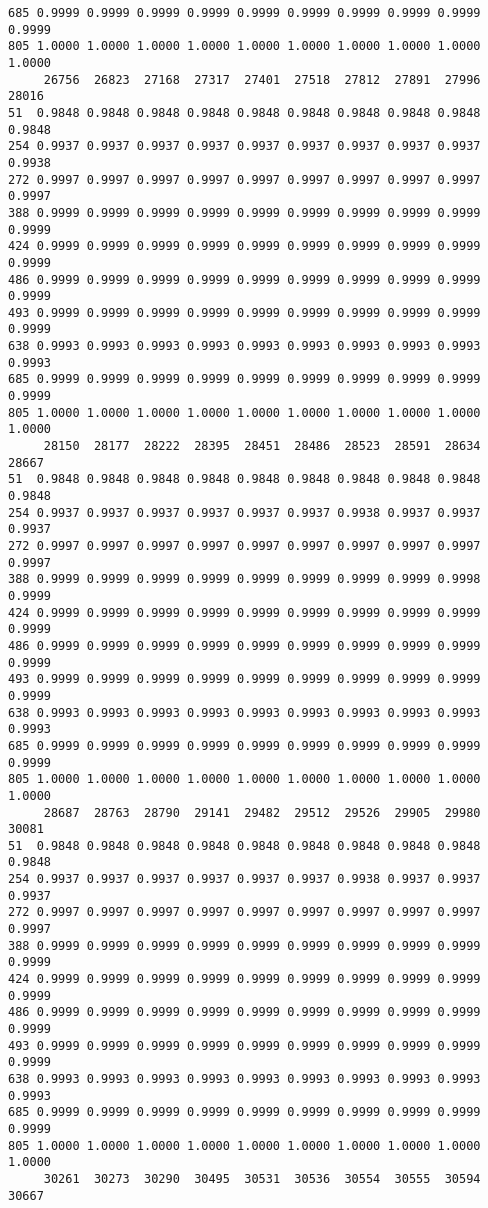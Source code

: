 \documentclass[
]{report}
\begin{document}
\begin{verbatim}
685 0.9999 0.9999 0.9999 0.9999 0.9999 0.9999 0.9999 0.9999 0.9999 0.9999
805 1.0000 1.0000 1.0000 1.0000 1.0000 1.0000 1.0000 1.0000 1.0000 1.0000
     26756  26823  27168  27317  27401  27518  27812  27891  27996  28016
51  0.9848 0.9848 0.9848 0.9848 0.9848 0.9848 0.9848 0.9848 0.9848 0.9848
254 0.9937 0.9937 0.9937 0.9937 0.9937 0.9937 0.9937 0.9937 0.9937 0.9938
272 0.9997 0.9997 0.9997 0.9997 0.9997 0.9997 0.9997 0.9997 0.9997 0.9997
388 0.9999 0.9999 0.9999 0.9999 0.9999 0.9999 0.9999 0.9999 0.9999 0.9999
424 0.9999 0.9999 0.9999 0.9999 0.9999 0.9999 0.9999 0.9999 0.9999 0.9999
486 0.9999 0.9999 0.9999 0.9999 0.9999 0.9999 0.9999 0.9999 0.9999 0.9999
493 0.9999 0.9999 0.9999 0.9999 0.9999 0.9999 0.9999 0.9999 0.9999 0.9999
638 0.9993 0.9993 0.9993 0.9993 0.9993 0.9993 0.9993 0.9993 0.9993 0.9993
685 0.9999 0.9999 0.9999 0.9999 0.9999 0.9999 0.9999 0.9999 0.9999 0.9999
805 1.0000 1.0000 1.0000 1.0000 1.0000 1.0000 1.0000 1.0000 1.0000 1.0000
     28150  28177  28222  28395  28451  28486  28523  28591  28634  28667
51  0.9848 0.9848 0.9848 0.9848 0.9848 0.9848 0.9848 0.9848 0.9848 0.9848
254 0.9937 0.9937 0.9937 0.9937 0.9937 0.9937 0.9938 0.9937 0.9937 0.9937
272 0.9997 0.9997 0.9997 0.9997 0.9997 0.9997 0.9997 0.9997 0.9997 0.9997
388 0.9999 0.9999 0.9999 0.9999 0.9999 0.9999 0.9999 0.9999 0.9998 0.9999
424 0.9999 0.9999 0.9999 0.9999 0.9999 0.9999 0.9999 0.9999 0.9999 0.9999
486 0.9999 0.9999 0.9999 0.9999 0.9999 0.9999 0.9999 0.9999 0.9999 0.9999
493 0.9999 0.9999 0.9999 0.9999 0.9999 0.9999 0.9999 0.9999 0.9999 0.9999
638 0.9993 0.9993 0.9993 0.9993 0.9993 0.9993 0.9993 0.9993 0.9993 0.9993
685 0.9999 0.9999 0.9999 0.9999 0.9999 0.9999 0.9999 0.9999 0.9999 0.9999
805 1.0000 1.0000 1.0000 1.0000 1.0000 1.0000 1.0000 1.0000 1.0000 1.0000
     28687  28763  28790  29141  29482  29512  29526  29905  29980  30081
51  0.9848 0.9848 0.9848 0.9848 0.9848 0.9848 0.9848 0.9848 0.9848 0.9848
254 0.9937 0.9937 0.9937 0.9937 0.9937 0.9937 0.9938 0.9937 0.9937 0.9937
272 0.9997 0.9997 0.9997 0.9997 0.9997 0.9997 0.9997 0.9997 0.9997 0.9997
388 0.9999 0.9999 0.9999 0.9999 0.9999 0.9999 0.9999 0.9999 0.9999 0.9999
424 0.9999 0.9999 0.9999 0.9999 0.9999 0.9999 0.9999 0.9999 0.9999 0.9999
486 0.9999 0.9999 0.9999 0.9999 0.9999 0.9999 0.9999 0.9999 0.9999 0.9999
493 0.9999 0.9999 0.9999 0.9999 0.9999 0.9999 0.9999 0.9999 0.9999 0.9999
638 0.9993 0.9993 0.9993 0.9993 0.9993 0.9993 0.9993 0.9993 0.9993 0.9993
685 0.9999 0.9999 0.9999 0.9999 0.9999 0.9999 0.9999 0.9999 0.9999 0.9999
805 1.0000 1.0000 1.0000 1.0000 1.0000 1.0000 1.0000 1.0000 1.0000 1.0000
     30261  30273  30290  30495  30531  30536  30554  30555  30594  30667

\end{verbatim}
\end{document}

